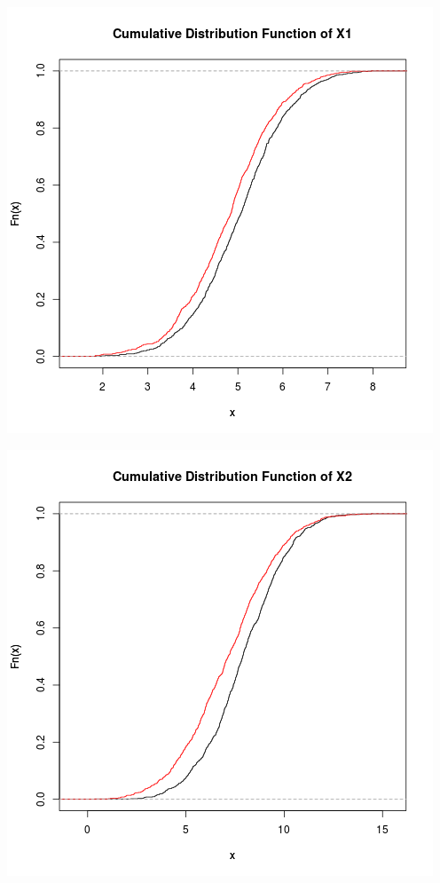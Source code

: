 \documentclass{article}
\begin{document}
\includegraphics{"plot2_3"}
\pagebreak

\includegraphics{"plot2_4"}
\pagebreak
\end{document}
